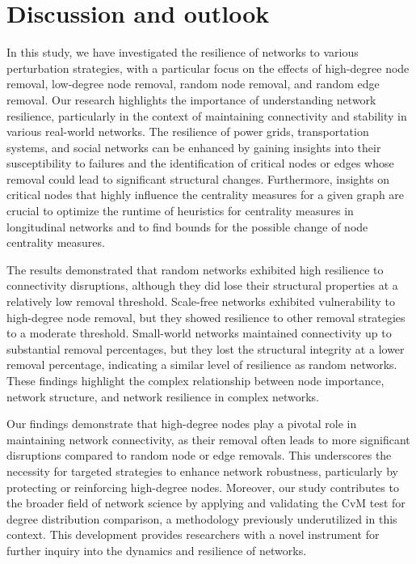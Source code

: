 \documentclass[conference]{IEEEtran} %
\begin{document}
\section{Discussion and outlook}

In this study, we have investigated the resilience of networks to various perturbation strategies, with a particular focus on the effects of high-degree node removal, low-degree node removal, random node removal, and random edge removal. Our research highlights the importance of understanding network resilience, particularly in the context of maintaining connectivity and stability in various real-world networks. The resilience of power grids, transportation systems, and social networks can be enhanced by gaining insights into their susceptibility to failures and the identification of critical nodes or edges whose removal could lead to significant structural changes. Furthermore, insights on critical nodes that highly influence the centrality measures for a given graph are crucial to optimize the runtime of heuristics for centrality measures in longitudinal networks and to find bounds for the possible change of node centrality measures. 

The results demonstrated that random networks exhibited high resilience to connectivity disruptions, although they did lose their structural properties at a relatively low removal threshold. Scale-free networks exhibited vulnerability to high-degree node removal, but they showed resilience to other removal strategies to a moderate threshold. Small-world networks maintained connectivity up to substantial removal percentages, but they lost the structural integrity at a lower removal percentage, indicating a similar level of resilience as random networks. These findings highlight the complex relationship between node importance, network structure, and network resilience in complex networks.

Our findings demonstrate that high-degree nodes play a pivotal role in maintaining network connectivity, as their removal often leads to more significant disruptions compared to random node or edge removals. This underscores the necessity for targeted strategies to enhance network robustness, particularly by protecting or reinforcing high-degree nodes. Moreover, our study contributes to the broader field of network science by applying and validating the CvM test for degree distribution comparison, a methodology previously underutilized in this context. This development provides researchers with a novel instrument for further inquiry into the dynamics and resilience of networks.
\end{document}
